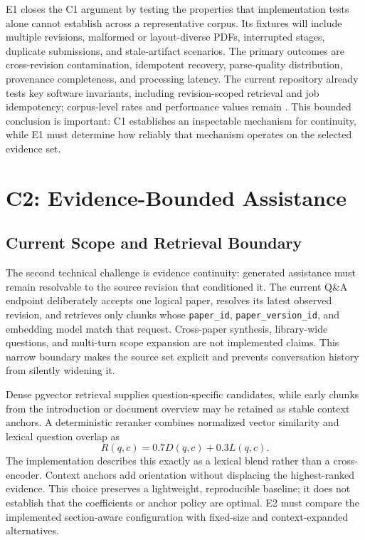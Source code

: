 E1 closes the C1 argument by testing the properties that implementation tests alone cannot establish across a representative corpus. Its fixtures will include multiple revisions, malformed or layout-diverse PDFs, interrupted stages, duplicate submissions, and stale-artifact scenarios. The primary outcomes are cross-revision contamination, idempotent recovery, parse-quality distribution, provenance completeness, and processing latency. The current repository already tests key software invariants, including revision-scoped retrieval and job idempotency; corpus-level rates and performance values remain \pending{}. This bounded conclusion is important: C1 establishes an inspectable mechanism for continuity, while E1 must determine how reliably that mechanism operates on the selected evidence set.

\section{C2: Evidence-Bounded Assistance}
\label{sec:c2-evidence}

\subsection{Current Scope and Retrieval Boundary}

The second technical challenge is evidence continuity: generated assistance must remain resolvable to the source revision that conditioned it. The current Q\&A endpoint deliberately accepts one logical paper, resolves its latest observed revision, and retrieves only chunks whose \texttt{paper\_id}, \texttt{paper\_version\_id}, and embedding model match that request. Cross-paper synthesis, library-wide questions, and multi-turn scope expansion are not implemented claims. This narrow boundary makes the source set explicit and prevents conversation history from silently widening it.

Dense pgvector retrieval supplies question-specific candidates, while early chunks from the introduction or document overview may be retained as stable context anchors. A deterministic reranker combines normalized vector similarity and lexical question overlap as
\[
  R(q,c)=0.7D(q,c)+0.3L(q,c).
\]
The implementation describes this exactly as a lexical blend rather than a cross-encoder. Context anchors add orientation without displacing the highest-ranked evidence. This choice preserves a lightweight, reproducible baseline; it does not establish that the coefficients or anchor policy are optimal. E2 must compare the implemented section-aware configuration with fixed-size and context-expanded alternatives.

